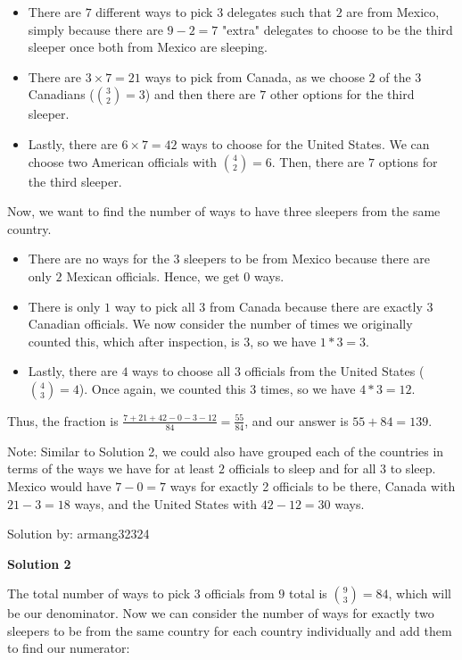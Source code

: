 \begin{enumerate}
 
            \begin{itemize}
        \item There are $7$ different ways to pick $3$ delegates such that $2$ are from Mexico, simply because there are $9-2=7$ "extra" delegates to choose to be the third sleeper once both from Mexico are sleeping.
        \item There are $3\times7=21$ ways to pick from Canada, as we choose $2$ of the $3$ Canadians ($\binom{3}{2} = 3$) and then there are $7$ other options for the third sleeper.
        \item Lastly, there are $6\times7=42$ ways to choose for the United States. We can choose two American officials with $\binom{4}{2} = 6$. Then, there are $7$ options for the third sleeper.
            \end{itemize}
            Now, we want to find the number of ways to have three sleepers from the same country.

 
            \begin{itemize}
        \item There are no ways for the $3$ sleepers to be from Mexico because there are only $2$ Mexican officials. Hence, we get $0$ ways.
        \item There is only $1$ way to pick all $3$ from Canada because there are exactly $3$ Canadian officials. We now consider the number of times we originally counted this, which after inspection, is $3$, so we have $1 * 3 = 3$.
        \item Lastly, there are $4$ ways to choose all $3$ officials from the United States ($\binom{4}{3} = 4$). Once again, we counted this $3$ times, so we have $4*3 = 12$.
            \end{itemize}
            Thus, the fraction is $\frac{7+21+42-0-3-12}{84} = \frac{55}{84}$, and our answer is $55+84=\boxed{139}$.

 Note: Similar to Solution 2, we could also have grouped each of the countries in terms of the ways we have for at least $2$ officials to sleep and for all $3$ to sleep. Mexico would have $7 - 0 = 7$ ways for exactly 2 officials to be there, Canada with $21 - 3 = 18$ ways, and the United States with $42 - 12 = 30$ ways.

 Solution by: armang32324

 



\textbf{Solution 2}

The total number of ways to pick $3$ officials from $9$ total is $\binom{9}{3} = 84$, which will be our denominator. Now we can consider the number of ways for exactly two sleepers to be from the same country for each country individually and add them to find our numerator:


\end{enumerate}
